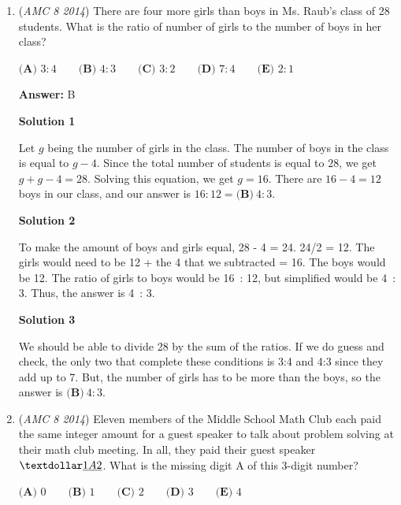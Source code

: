 \begin{enumerate}
 Plugging in $n = 6$ gives $\boxed{\textbf{(D)}~182}$.

 


 


	\item (\textit{AMC 8 2014}) There are four more girls than boys in Ms. Raub's class of 28 students. What is the ratio of number of girls to the number of boys in her class?


 $\textbf{(A) }3 : 4\qquad\textbf{(B) }4 : 3\qquad\textbf{(C) }3 : 2\qquad\textbf{(D) }7 : 4\qquad\textbf{(E) }2 : 1$

 \textbf{Answer: }B



\textbf{Solution 1}

Let $g$ being the number of girls in the class. The number of boys in the class is equal to $g-4$. Since the total number of students is equal to $28$, we get $g+g-4=28$. Solving this equation, we get $g=16$. There are $16-4=12$ boys in our class, and our answer is $16:12=\boxed{\textbf{(B)}~4:3}$.

 



\textbf{Solution 2}

To make the amount of boys and girls equal, 28 - 4 = 24.  24/2 = 12.  The girls would need to be 12 + the 4 that we subtracted = 16. The boys would be 12.  The ratio of girls to boys would be 16 : 12, but simplified would be 4 : 3.  Thus, the answer is 4 : 3.

 



\textbf{Solution 3}

We should be able to divide 28 by the sum of the ratios. If we do guess and check, the only two that complete these conditions is 3:4 and 4:3 since they add up to 7. But, the number of girls has to be more than the boys, so the answer is $\boxed{\textbf{(B)}~4:3}$.

 


 


	\item (\textit{AMC 8 2014}) Eleven members of the Middle School Math Club each paid the same integer amount for a guest speaker to talk about problem solving at their math club meeting. In all, they paid their guest speaker $\textdollar\underline{1}\underline{A}\underline{2}$. What is the missing digit A of this 3-digit number?


 $\textbf{(A) }0\qquad\textbf{(B) }1\qquad\textbf{(C) }2\qquad\textbf{(D) }3\qquad\textbf{(E) }4$


\end{enumerate}
